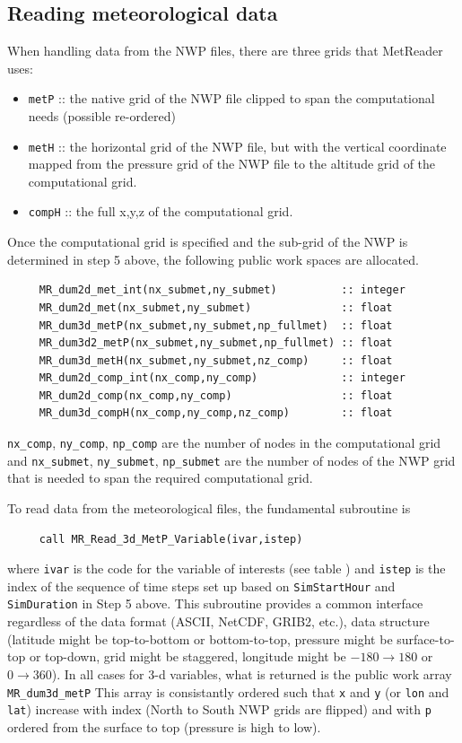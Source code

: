\documentclass[11pt]{article}   %
\begin{document}
\subsection{Reading meteorological data}
When handling data from the NWP files, there are three grids that MetReader uses:
\begin{itemize}
\item \texttt{metP} :: the native grid of the NWP file clipped to span the
computational needs (possible re-ordered)
\item \texttt{metH} :: the horizontal grid of the NWP file, but with the vertical
coordinate mapped from the pressure grid of the NWP file to the altitude grid of 
the computational grid.
\item \texttt{compH} :: the full x,y,z of the computational grid.
\end{itemize}
Once the computational grid is specified and the sub-grid of the NWP is determined in 
step 5 above, the following public work spaces are allocated.
\begin{verbatim}
     MR_dum2d_met_int(nx_submet,ny_submet)          :: integer
     MR_dum2d_met(nx_submet,ny_submet)              :: float
     MR_dum3d_metP(nx_submet,ny_submet,np_fullmet)  :: float
     MR_dum3d2_metP(nx_submet,ny_submet,np_fullmet) :: float
     MR_dum3d_metH(nx_submet,ny_submet,nz_comp)     :: float
     MR_dum2d_comp_int(nx_comp,ny_comp)             :: integer
     MR_dum2d_comp(nx_comp,ny_comp)                 :: float
     MR_dum3d_compH(nx_comp,ny_comp,nz_comp)        :: float
\end{verbatim}
\texttt{nx\_comp}, \texttt{ny\_comp}, \texttt{np\_comp} are the number
of nodes in the computational grid and 
\texttt{nx\_submet}, \texttt{ny\_submet}, \texttt{np\_submet} are the
number of nodes of the NWP grid that is needed
to span the required computational grid.

To read data from the meteorological files, the fundamental subroutine is
\begin{verbatim}
     call MR_Read_3d_MetP_Variable(ivar,istep)
\end{verbatim}
where \texttt{ivar} is the code for the variable of interests (see table %
) and
\texttt{istep} is the index of the sequence of time steps set up based on
\texttt{SimStartHour} and \texttt{SimDuration} in Step 5 above.  This subroutine provides
a common interface regardless of the data format (ASCII, NetCDF, GRIB2, etc.), data
structure (latitude might be top-to-bottom or bottom-to-top, pressure might be surface-to-top
or top-down, grid might be staggered, longitude might be $-180 \rightarrow 180$ or $0 \rightarrow 360$).
In all cases for 3-d variables, what is returned is the public work array
\texttt{MR\_dum3d\_metP}
This array is consistantly ordered such that \texttt{x}
and \texttt{y} (or \texttt{lon} and \texttt{lat}) increase with index (North to South NWP grids
are flipped) and with \texttt{p} ordered from the surface to top (pressure is high to low).
\end{document}
